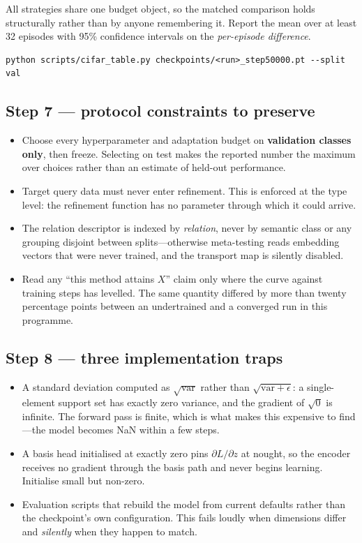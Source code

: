 \documentclass[11pt]{article}
\begin{document}
All strategies share one budget object, so the matched comparison holds structurally rather than by
anyone remembering it. Report the mean over at least 32 episodes with 95\% confidence intervals on
the \emph{per-episode difference}.

\begin{verbatim}
python scripts/cifar_table.py checkpoints/<run>_step50000.pt --split val
\end{verbatim}

\subsection*{Step 7 --- protocol constraints to preserve}

\begin{itemize}[leftmargin=*, itemsep=3pt]
\item Choose every hyperparameter and adaptation budget on \textbf{validation classes only}, then
      freeze. Selecting on test makes the reported number the maximum over choices rather than an
      estimate of held-out performance.
\item Target query data must never enter refinement. This is enforced at the type level: the
      refinement function has no parameter through which it could arrive.
\item The relation descriptor is indexed by \emph{relation}, never by semantic class or any
      grouping disjoint between splits---otherwise meta-testing reads embedding vectors that were
      never trained, and the transport map is silently disabled.
\item Read any ``this method attains $X$'' claim only where the curve against training steps has
      levelled. The same quantity differed by more than twenty percentage points between an
      undertrained and a converged run in this programme.
\end{itemize}

\subsection*{Step 8 --- three implementation traps}

\begin{itemize}[leftmargin=*, itemsep=3pt]
\item A standard deviation computed as $\sqrt{\mathrm{var}}$ rather than
      $\sqrt{\mathrm{var}+\epsilon}$: a single-element support set has exactly zero variance, and
      the gradient of $\sqrt{0}$ is infinite. The forward pass is finite, which is what makes this
      expensive to find---the model becomes NaN within a few steps.
\item A basis head initialised at exactly zero pins $\partial L/\partial z$ at nought, so the
      encoder receives no gradient through the basis path and never begins learning. Initialise
      small but non-zero.
\item Evaluation scripts that rebuild the model from current defaults rather than the checkpoint's
      own configuration. This fails loudly when dimensions differ and \emph{silently} when they
      happen to match.
\end{itemize}
\end{document}
